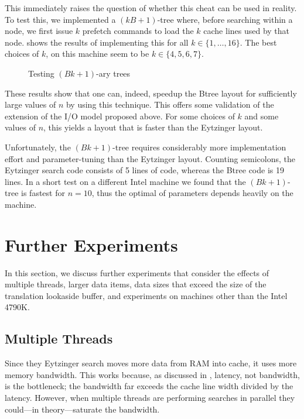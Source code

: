\documentclass{patmorin}
\begin{document}
This immediately raises the question of whether this cheat can be used
in reality.  To test this, we implemented a $(kB+1)$-tree where, before
searching within a node, we first issue $k$ prefetch commands to load the
$k$ cache lines used by that node.   shows the results of
implementing this for all $k\in\{1,\ldots,16\}$. The best choices of $k$, on this machine seem to be $k\in\{4,5,6,7\}$.

\begin{figure}
   \caption{Testing $(Bk+1)$-ary trees}
\end{figure}

These results show that one can, indeed, speedup the Btree layout for
sufficiently large values of $n$ by using this technique.  This offers
some validation of the extension of the I/O model proposed above.
For some choices of $k$ and some values of $n$, this yields a layout
that is faster than the Eytzinger layout. 

Unfortunately, the $(Bk+1)$-tree requires considerably more
implementation effort and parameter-tuning than the Eytzinger layout.
Counting semicolons, the Eytzinger search code consists of 5 lines of
code, whereas the Btree code is 19 lines.  In a short test on a different
Intel machine we found that the $(Bk+1)$-tree is fastest for $n=10$, thus
the optimal of parameters depends heavily on the machine.

\section{Further Experiments}

In this section, we discuss further experiments that consider the effects
of multiple threads, larger data items, data sizes that exceed the size
of the translation lookaside buffer, and experiments on machines other
than the Intel 4790K.

\subsection{Multiple Threads}

Since they Eytzinger search moves more data from RAM into cache,
it uses more memory bandwidth.  This works because, as discussed in
, latency, not bandwidth, is the bottleneck; the
bandwidth far exceeds the cache line width divided by the latency.
However, when multiple threads are performing searches in parallel they
could---in theory---saturate the bandwidth.
\end{document}
